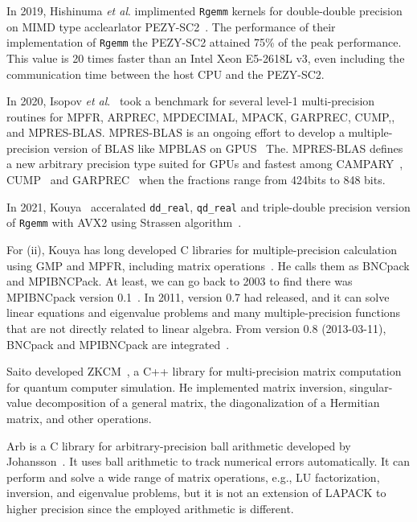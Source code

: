 \documentclass[12pt]{article}
\newcommand{\etal}{\textit{et al}.}
\begin{document}
In 2019, Hishinuma \etal{} implimented {\tt Rgemm} kernels for double-double precision on MIMD type acclearlator PEZY-SC2~\cite{hishinuma2019pzqd}.
The performance of their implementation of {\tt Rgemm} the PEZY-SC2 attained 75\% of the peak performance. This value is 20 times faster than an Intel Xeon E5-2618L v3, even including the communication time between the host CPU and the PEZY-SC2.

In 2020, Isopov \etal{}~\cite{ISUPOV2020105506} took a benchmark for several level-1 multi-precision routines for MPFR, ARPREC, MPDECIMAL, MPACK, GARPREC, CUMP,, and MPRES-BLAS. MPRES-BLAS is an ongoing effort to develop a multiple-precision version of BLAS like MPBLAS on GPUS~ The\cite{10.1007/978-3-030-64616-5_4}. MPRES-BLAS defines a new arbitrary precision type suited for GPUs and fastest among CAMPARY~\cite{10.1007/978-3-319-42432-3_29}, CUMP~\cite{Nakayama2011ImplementationOM} and GARPREC~\cite{Lu:2010:SEP:1869389.1869392} when the fractions range from 424bits to 848 bits.

In 2021, Kouya~\cite{10.1007/978-3-030-86976-2_14} acceralated {\tt dd\_real}, {\tt qd\_real} and triple-double precision version of {\tt Rgemm} with AVX2 using Strassen algorithm~\cite{STRASSEN1969}.

For (ii), Kouya has long developed C libraries for multiple-precision calculation using GMP and MPFR, including matrix operations~\cite{BNCpack}. He calls them as BNCpack and MPIBNCPack. At least, we can go back to 2003 to find there was MPIBNCpack version 0.1~\cite{MPIBNCPack01}. In 2011, version 0.7 had released, and it can solve linear equations and eigenvalue problems and many multiple-precision functions that are not directly related to linear algebra. From version 0.8 (2013-03-11), BNCpack and MPIBNCpack are integrated~\cite{BNCpack,1710.01839}.

Saito developed ZKCM~\cite{SAITOH20132005}, a C++ library for multi-precision matrix computation for quantum computer simulation. He implemented matrix inversion, singular-value decomposition of a general matrix, the diagonalization of a Hermitian matrix, and other operations.

Arb is a C library for arbitrary-precision ball arithmetic developed by Johansson~\cite{1611.02831}. It uses ball arithmetic to track
numerical errors automatically.  It can perform and solve a wide range of matrix operations, e.g.,  LU factorization, inversion, and eigenvalue problems, but it is not an extension of LAPACK to higher precision since the employed arithmetic is different.
\end{document}

